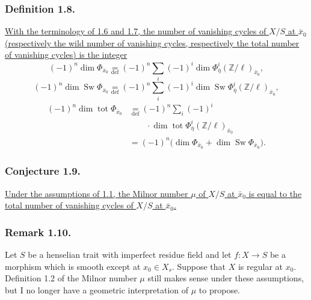 \subsubsection*{Definition 1.8.}
\underline{With the terminology of 1.6 and 1.7, the number of
vanishing cycles of $X/S$ at $\bar x_0$ (respectively the wild
number of vanishing cycles, respectively the total number of
vanishing cycles) is the integer}
\[
(-1)^n\dim\Phi_{\bar x_0}
\underset{\mathrm{def}}{=}
(-1)^n\sum_i(-1)^i
\dim\Phi^i_{\bar\eta}(\mathbb Z/\ell)_{\bar x_0},
\]
\[
(-1)^n\dim\operatorname{Sw}\Phi_{\bar x_0}
\underset{\mathrm{def}}{=}
(-1)^n\sum_i(-1)^i
\dim\operatorname{Sw}
\Phi^i_{\bar\eta}(\mathbb Z/\ell)_{\bar x_0},
\]
\[
\begin{aligned}
(-1)^n\dim\operatorname{tot}\Phi_{\bar x_0}
&\underset{\mathrm{def}}{=}
(-1)^n\sum_i(-1)^i\\[-2pt]
&\qquad{}\cdot\dim\operatorname{tot}
\Phi^i_{\bar\eta}(\mathbb Z/\ell)_{\bar x_0}\\
&=(-1)^n\bigl(
\dim\Phi_{\bar x_0}+\dim\operatorname{Sw}\Phi_{\bar x_0}
\bigr).
\end{aligned}
\]

\subsubsection*{Conjecture 1.9.}
\underline{Under the assumptions of 1.1, the Milnor number $\mu$ of
$X/S$ at $\bar x_0$ is equal to the total number of vanishing cycles
of $X/S$ at $\bar x_0$.}

\subsubsection*{Remark 1.10.}
Let $S$ be a henselian trait with imperfect residue field and let
$f:X\to S$ be a morphism which is smooth except at
$x_0\in X_s$.  Suppose that $X$ is regular at $x_0$.  Definition
1.2 of the Milnor number $\mu$ still makes sense under these
assumptions, but I no longer have a geometric interpretation of
$\mu$ to propose.

